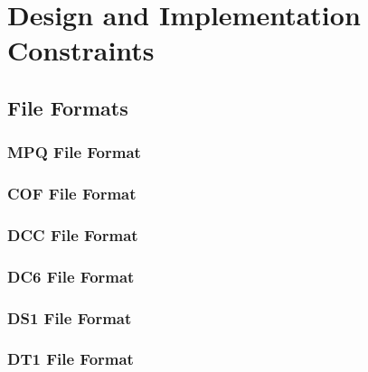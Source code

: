 \section{Design and Implementation Constraints} \label{sec:design_constraints}


\subsection{File Formats}
\subsubsection{MPQ File Format}

\subsubsection{COF File Format}

\subsubsection{DCC File Format}

\subsubsection{DC6 File Format}

\subsubsection{DS1 File Format}

\subsubsection{DT1 File Format}

